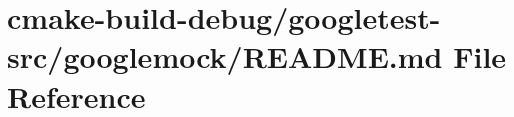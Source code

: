 \hypertarget{cmake-build-debug_2googletest-src_2googlemock_2README_8md}{}\section{cmake-\/build-\/debug/googletest-\/src/googlemock/\+R\+E\+A\+D\+ME.md File Reference}
\label{cmake-build-debug_2googletest-src_2googlemock_2README_8md}
